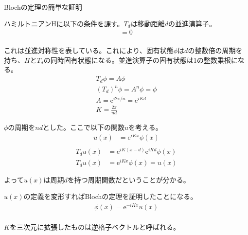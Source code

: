 \documentclass[a4paper, lualatex]{bxjsarticle}
\begin{document}
\appendix
\begin{section}{Blochの定理の簡単な証明}
    \par ハミルトニアンHに以下の条件を課す。$T_d$は移動距離$d$の並進演算子。
    \begin{align}
     [T_d,H]=0\nonumber\\
    \end{align}
    \par これは並進対称性を表している。これにより、固有状態$\phi$は$d$の整数倍の周期を持ち、$H$と$T_d$の同時固有状態になる。並進演算子の固有状態は1の整数乗根になる。
    \begin{align}
     T_d\phi=A\phi\nonumber\\
        (T_d)^n\phi=A^n\phi=\phi\nonumber\\
        A=\mathrm{e}^{i2\pi/n}=\mathrm{e}^{iKd}\nonumber\\
        K=\frac{2\pi}{n d}
    \end{align}
    \par $\phi$の周期を$nd$とした。ここで以下の関数$u$を考える。
    \begin{align}
     u(x) &= \mathrm{e}^{iKx}\phi(x)\label{ux}\nonumber\\
    \end{align}
    \begin{align}
     T_d u(x) &= \mathrm{e}^{iK(x-d)}\mathrm{e}^{iKd}\phi(x)\nonumber\\
        T_d u(x) &= \mathrm{e}^{iKx}\phi(x)=u(x)
    \end{align}
    \par よって$u(x)$は周期$d$を持つ周期関数だということが分かる。
    \par $u(x)$の定義を変形すればBlochの定理を証明したことになる。
    \begin{align}
     \phi(x) = \mathrm{e}^{-iKx}u(x)\nonumber\\
    \end{align}
    \par $K$を三次元に拡張したものは逆格子ベクトルと呼ばれる。
\end{section}
\end{document}
